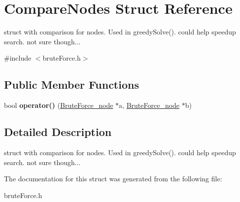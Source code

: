 \hypertarget{struct_compare_nodes}{}\section{Compare\+Nodes Struct Reference}
\label{struct_compare_nodes}


struct with comparison for nodes. Used in greedy\+Solve(). could help speedup search. not sure though...  




{\ttfamily \#include $<$brute\+Force.\+h$>$}

\subsection*{Public Member Functions}
\begin{DoxyCompactItemize}
\item 
\hypertarget{struct_compare_nodes_a2e5c79f8b055be389af6b4945e310474}{}bool {\bfseries operator()} (\hyperlink{class_brute_force__node}{Brute\+Force\+\_\+node} $\ast$a, \hyperlink{class_brute_force__node}{Brute\+Force\+\_\+node} $\ast$b)\label{struct_compare_nodes_a2e5c79f8b055be389af6b4945e310474}

\end{DoxyCompactItemize}


\subsection{Detailed Description}
struct with comparison for nodes. Used in greedy\+Solve(). could help speedup search. not sure though... 

The documentation for this struct was generated from the following file\+:\begin{DoxyCompactItemize}
\item 
brute\+Force.\+h\end{DoxyCompactItemize}
